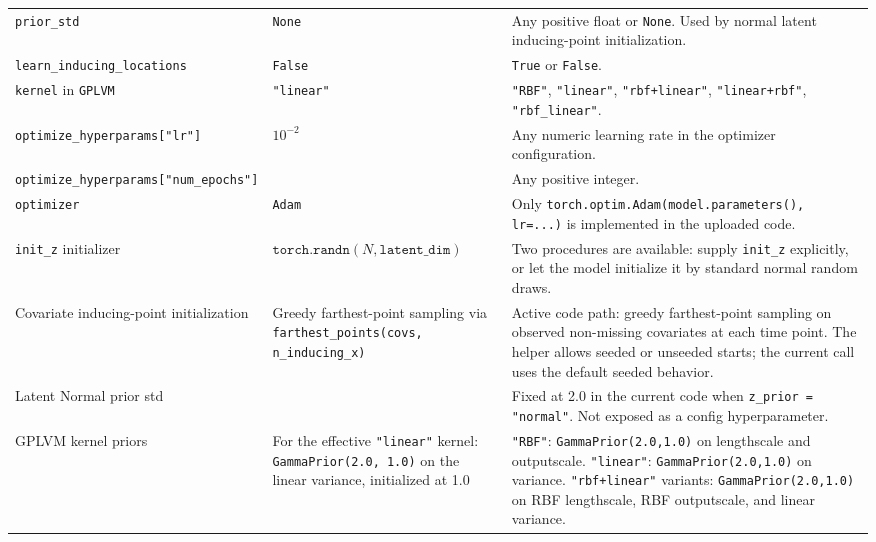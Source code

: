 \begin{table}[htbp]
\begin{threeparttable}
\begin{tabularx}{\textwidth}{
    >{\raggedright\arraybackslash}p{}
    >{\raggedright\arraybackslash}p{}
    >{\raggedright\arraybackslash}X
}
\texttt{prior\_std}
& \texttt{None}
& Any positive float or \texttt{None}. Used by normal latent inducing-point initialization. \\

\texttt{learn\_inducing\_locations}
& \texttt{False}
& \texttt{True} or \texttt{False}. \\

\texttt{kernel} in \texttt{GPLVM}
& \texttt{"linear"}
& \texttt{"RBF"}, \texttt{"linear"}, \texttt{"rbf+linear"}, \texttt{"linear+rbf"}, \texttt{"rbf\_linear"}. \\

\texttt{optimize\_hyperparams["lr"]}
& \(10^{-2}\)
& Any numeric learning rate in the optimizer configuration. \\

\texttt{optimize\_hyperparams["num\_epochs"]}
& 6000
& Any positive integer. \\

\texttt{optimizer}
& \texttt{Adam}
& Only \texttt{torch.optim.Adam(model.parameters(), lr=...)} is implemented in the uploaded code. \\

\texttt{init\_z} initializer
& \(\texttt{torch.randn}(N,\texttt{latent\_dim})\)
& Two procedures are available: supply \texttt{init\_z} explicitly, or let the model initialize it by standard normal random draws. \\

Covariate inducing-point initialization
& Greedy farthest-point sampling via \texttt{farthest\_points(covs, n\_inducing\_x)}
& Active code path: greedy farthest-point sampling on observed non-missing covariates at each time point. The helper allows seeded or unseeded starts; the current call uses the default seeded behavior. \\

Latent Normal prior std
& 2.0
& Fixed at 2.0 in the current code when \texttt{z\_prior = "normal"}. Not exposed as a config hyperparameter. \\

GPLVM kernel priors
& For the effective \texttt{"linear"} kernel: \texttt{GammaPrior(2.0, 1.0)} on the linear variance, initialized at 1.0
& \texttt{"RBF"}: \texttt{GammaPrior(2.0,1.0)} on lengthscale and outputscale. \newline
\texttt{"linear"}: \texttt{GammaPrior(2.0,1.0)} on variance. \newline
\texttt{"rbf+linear"} variants: \texttt{GammaPrior(2.0,1.0)} on RBF lengthscale, RBF outputscale, and linear variance. \\


\end{tabularx}
\end{threeparttable}
\end{table}
